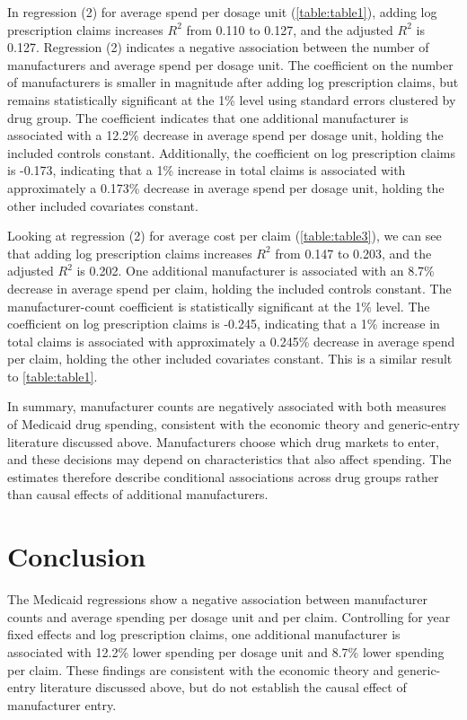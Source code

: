 In regression (2) for average spend per dosage unit (\autoref{table:table1}), adding log prescription claims increases $R^2$ from 0.110 to 0.127, and the adjusted $R^2$ is 0.127. Regression (2) indicates a negative association between the number of manufacturers and average spend per dosage unit. The coefficient on the number of manufacturers is smaller in magnitude after adding log prescription claims, but remains statistically significant at the 1\% level using standard errors clustered by drug group. The coefficient indicates that one additional manufacturer is associated with a 12.2\% decrease in average spend per dosage unit, holding the included controls constant. Additionally, the coefficient on log prescription claims is -0.173, indicating that a 1\% increase in total claims is associated with approximately a 0.173\% decrease in average spend per dosage unit, holding the other included covariates constant. 

Looking at regression (2) for average cost per claim (\autoref{table:table3}), we can see that adding log prescription claims increases $R^2$ from 0.147 to 0.203, and the adjusted $R^2$ is 0.202. One additional manufacturer is associated with an 8.7\% decrease in average spend per claim, holding the included controls constant. The manufacturer-count coefficient is statistically significant at the 1\% level. The coefficient on log prescription claims is -0.245, indicating that a 1\% increase in total claims is associated with approximately a 0.245\% decrease in average spend per claim, holding the other included covariates constant. This is a similar result to \autoref{table:table1}.

In summary, manufacturer counts are negatively associated with both measures of Medicaid drug spending, consistent with the economic theory and generic-entry literature discussed above. Manufacturers choose which drug markets to enter, and these decisions may depend on characteristics that also affect spending. The estimates therefore describe conditional associations across drug groups rather than causal effects of additional manufacturers. 

\section{Conclusion}
The Medicaid regressions show a negative association between manufacturer counts and average spending per dosage unit and per claim. Controlling for year fixed effects and log prescription claims, one additional manufacturer is associated with 12.2\% lower spending per dosage unit and 8.7\% lower spending per claim. These findings are consistent with the economic theory and generic-entry literature discussed above, but do not establish the causal effect of manufacturer entry.

